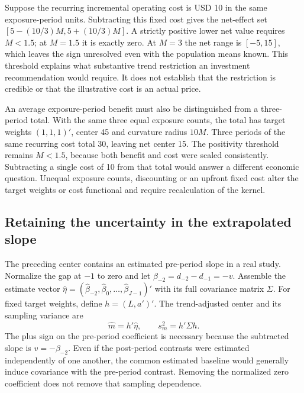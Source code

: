 Suppose the recurring incremental operating cost is USD 10 in the same
exposure-period units. Subtracting this fixed cost gives the net-effect set
$[5-(10/3)M,5+(10/3)M]$. A strictly positive lower net value requires
$M<1.5$; at $M=1.5$ it is exactly zero. At $M=3$ the net range is
$[-5,15]$, which leaves the sign unresolved even with the population means
known. This threshold explains what substantive trend restriction an
investment recommendation would require. It does not establish that the
restriction is credible or that the illustrative cost is an actual price.

An average exposure-period benefit must also be distinguished from a
three-period total. With the same three equal exposure counts, the total
has target weights $(1,1,1)'$, center 45 and curvature radius $10M$.
Three periods of the same recurring cost total 30, leaving net center 15.
The positivity threshold remains $M<1.5$, because both benefit and cost
were scaled consistently. Subtracting a single cost of 10 from that total
would answer a different economic question. Unequal exposure counts,
discounting or an upfront fixed cost alter the target weights or cost
functional and require recalculation of the kernel.

\subsection{Retaining the uncertainty in the extrapolated slope}

The preceding center contains an estimated pre-period slope in a real study.
Normalize the gap at $-1$ to zero and let
$\beta_{-2}=d_{-2}-d_{-1}=-v$. Assemble the estimate vector
$\widehat\eta=(\widehat\beta_{-2},\widehat\beta_0,\ldots,
\widehat\beta_{J-1})'$ with its full covariance matrix $\Sigma$.
For fixed target weights, define $h=(L,a')'$. The trend-adjusted center
and its sampling variance are
\begin{equation}
 \widehat m=h'\widehat\eta,\qquad s_m^2=h'\Sigma h.
 \label{exec17:s6-noisy-slope}
\end{equation}
The plus sign on the pre-period coefficient is necessary because the
subtracted slope is $v=-\beta_{-2}$. Even if the post-period contrasts
were estimated independently of one another, the common estimated baseline
would generally induce covariance with the pre-period contrast. Removing the
normalized zero coefficient does not remove that sampling dependence.


